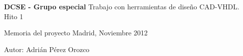 \begin{titlepage}
\sffamily
\begin{flushright}

\rightskip=-0cm


\vspace*{3cm}


\huge{\textbf{DCSE - Grupo especial}}
\linebreak
\LARGE{Trabajo con herramientas de diseño CAD-VHDL.}
\LARGE{Hito 1}

\vspace*{8cm}




\large{Memoria del proyecto}
\linebreak
\normalsize{Madrid, Noviembre 2012}

\vspace*{3cm}


\normalsize{Autor:}
\linebreak
\large{Adrián Pérez Orozco}
\linebreak

\end{flushright}
\end{titlepage}
